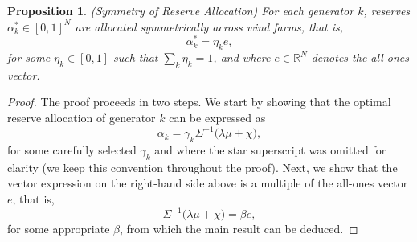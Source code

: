 \documentclass{article}
\newtheorem{proposition}{Proposition}
\begin{document}
\begin{proposition}\label{ReserveAllocation}
(Symmetry of Reserve Allocation) For each generator $k$, reserves $\alpha_k^* \in [0, 1]^N$ are allocated symmetrically across wind farms, that is,
\begin{equation*}
\alpha_{k}^* = \eta_k e,
\end{equation*}
for some $\eta_k \in [0, 1]$ such that $\sum_k \eta_k = 1$, and where $e \in \mathbb{R}^N$ denotes the all-ones vector.
\end{proposition}
\begin{proof}
The proof proceeds in two steps. We start by showing that the optimal reserve allocation of generator $k$ can be expressed as
\begin{equation*}
\alpha_k = \gamma_k \Sigma^{-1} \Big(\lambda \mu + \chi \Big),
\end{equation*}
for some carefully selected $\gamma_k$ and where the star superscript was omitted for clarity (we keep this convention throughout the proof). Next, we show that the vector expression on the right-hand side above is a multiple of the all-ones vector $e$, that is,
\begin{equation*}
\Sigma^{-1} \Big(\lambda \mu + \chi \Big) = \beta e,
\end{equation*}
for some appropriate $\beta$, from which the main result can be deduced.


\end{proof}
\end{document}
